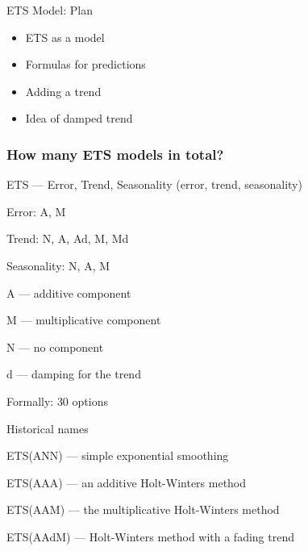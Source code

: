 
\begin{frame} %
	
	
\end{frame}



\begin{frame}{ETS Model: Plan}
	\begin{itemize}[<+->]
		\item ETS as a model
		\item Formulas for predictions
		\item Adding a trend
		\item Idea of damped trend
	\end{itemize}
	
\end{frame}




\begin{frame}
	\frametitle{How many ETS models in total?}
	
	ETS — \alert{Error, Trend, Seasonality} (error, trend, seasonality)
	
	\pause
	
	\alert{Error}: A, M
	
	\alert{Trend}: N, A, Ad, M, Md
	
	\alert{Seasonality}: N, A, M
	
	\pause
	A — \alert{additive} component
	
	M — \alert{multiplicative} component
	
	N — no component
	
	d — \alert{damping} for the trend
	
	\pause
	
	Formally: \alert{30 options}
	
\end{frame}


\begin{frame}{Historical names}
	
	ETS(ANN) — simple exponential smoothing
	
	ETS(AAA) —  an additive Holt-Winters method
	
	ETS(AAM) —  the multiplicative Holt-Winters method
	
	ETS(AAdM) — Holt-Winters method with a fading trend
	
\end{frame}




